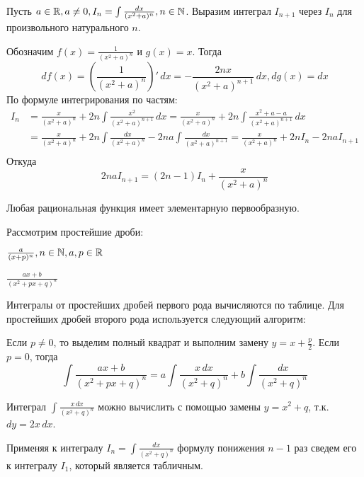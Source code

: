\begin{Example}
	Пусть $a \in \mathbb{R}, a \neq 0, I_n = \int \frac{dx}{(x^2 + a)^n}, n \in \mathbb{N}$. Выразим интеграл $I_{n + 1}$ через $I_n$ для произвольного натурального $n$.
	
	Обозначим $f(x) = \frac{1}{(x^2 + a)^n}$ и $g(x) = x$. Тогда
	\[df(x) = \left(\frac{1}{(x^2 + a)^n}\right)' \, dx = -\frac{2nx}{(x^2 + a)^{n + 1}} \, dx, dg(x) = dx\]
	По формуле интегрирования по частям:
	\begin{align*}
		I_n &= \frac{x}{(x^2 + a)^n} + 2n \int \frac{x^2}{(x^2 + a)^{n + 1}} \, dx = \frac{x}{(x^2 + a)^n} + 2n \int \frac{x^2 + a - a}{(x^2 + a)^{n + 1}} \, dx \\
		&= \frac{x}{(x^2 + a)^n} + 2n \int \frac{dx}{(x^2 + a)^n} - 2na \int \frac{dx}{(x^2 + a)^{n + 1}} = \frac{x}{(x^2 + a)^n} + 2n I_n - 2na I_{n + 1} \\
	\end{align*}
	Откуда
	\[2na I_{n + 1} = (2n - 1)I_n + \frac{x}{(x^2 + a)^n}\]
\end{Example} 

\begin{Prop}
	Любая рациональная функция имеет элементарную первообразную.
\end{Prop}

Рассмотрим простейшие дроби:

\begin{MyList}
	\item $\frac{a}{(x + p)^n}, n \in \mathbb{N}, a, p \in \mathbb{R}$ 
	\item $ \frac{ax + b}{(x^2 + px + q)^n}$ 
\end{MyList}

Интегралы от простейших дробей первого рода вычисляются по таблице. Для простейших дробей второго рода используется следующий алгоритм:

\begin{MyList}
	\item Если $p \neq 0$, то выделим полный квадрат и выполним замену $y = x + \frac{p}{2}$. Если $p = 0$, тогда
	\[\int \frac{ax + b}{(x^2 + px + q)^n} = a\int \frac{x \,dx}{(x^2 + q)^n} + b \int \frac{dx}{(x^2 + q)^n}\]
	\item Интеграл $\int \frac{x \, dx}{(x^2 + q)^n}$ можно вычислить с помощью замены $y = x^2 + q$, т.к. $dy = 2x \, dx$.
	\item Применяя к интегралу $I_n = \int \frac{dx}{(x^2 + q)^n}$ формулу понижения $n - 1$ раз сведем его к интегралу $I_1$, который является табличным.
\end{MyList}

